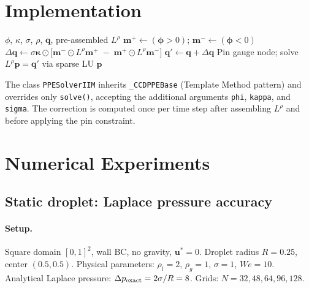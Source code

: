 \documentclass[11pt, a4paper]{article}
\begin{document}
\section{Implementation}
\label{sec:impl}

\begin{algorithm}
\caption{IIM-CCD PPE solve}
\label{alg:iim}
\begin{algorithmic}[1]
\REQUIRE $\phi$, $\kappa$, $\sigma$, $\rho$, $\mathbf{q}$, pre-assembled $L^\rho$
\STATE $\mathbf{m}^+ \leftarrow (\boldsymbol{\phi} > 0)$; \quad
       $\mathbf{m}^- \leftarrow (\boldsymbol{\phi} < 0)$
\STATE $\Delta\mathbf{q} \leftarrow \sigma\boldsymbol{\kappa} \odot
       \bigl[\mathbf{m}^- \odot L^\rho\mathbf{m}^+ \;-\;
             \mathbf{m}^+ \odot L^\rho\mathbf{m}^-\bigr]$
\STATE $\mathbf{q}' \leftarrow \mathbf{q} + \Delta\mathbf{q}$
\STATE Pin gauge node; solve $L^\rho \mathbf{p} = \mathbf{q}'$ via sparse LU
\RETURN $\mathbf{p}$
\end{algorithmic}
\end{algorithm}

The class \texttt{PPESolverIIM} inherits \texttt{\_CCDPPEBase} (Template Method
pattern) and overrides only \texttt{solve()}, accepting the additional arguments
\texttt{phi}, \texttt{kappa}, and \texttt{sigma}.
The correction is computed once per time step after assembling $L^\rho$ and
before applying the pin constraint.

\section{Numerical Experiments}
\label{sec:results}

\subsection{Static droplet: Laplace pressure accuracy}

\paragraph{Setup.}
Square domain $[0,1]^2$, wall BC, no gravity, $\mathbf{u}^* = 0$.
Droplet radius $R = 0.25$, center $(0.5, 0.5)$.
Physical parameters: $\rho_l = 2$, $\rho_g = 1$, $\sigma = 1$, $We = 10$.
Analytical Laplace pressure: $\Delta p_{\rm exact} = 2\sigma/R = 8$.
Grids: $N = 32, 48, 64, 96, 128$.
\end{document}
